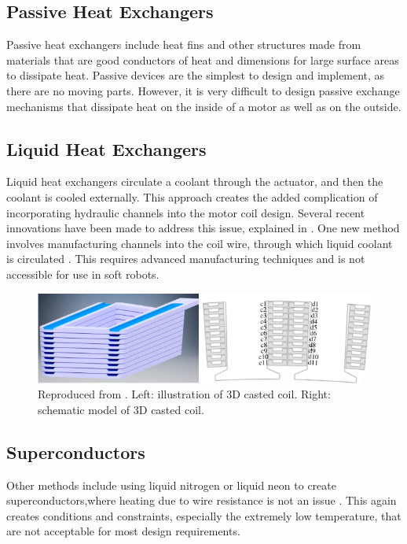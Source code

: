 \documentclass[a4paper,12pt]{article}
\begin{document}
\subsection{Passive Heat Exchangers}
Passive heat exchangers include heat fins and other structures made from materials that are good conductors of heat and dimensions for large surface areas to dissipate heat. Passive devices are the simplest to design and implement, as there are no moving parts. However, it is very difficult to design passive exchange mechanisms that dissipate heat on the inside of a motor as well as on the outside.

\subsection{Liquid Heat Exchangers}
Liquid heat exchangers circulate a coolant through the actuator, and then the coolant is cooled externally. This approach creates the added complication of incorporating hydraulic channels into the motor coil design. Several recent innovations have been made to address this issue, explained in \cite{henkeChallengesOpportunitiesVery2018}. One new method involves manufacturing channels into the coil wire, through which liquid coolant is circulated \cite{wohlersDesignDirectLiquid2018}. This requires advanced manufacturing techniques and is not accessible for use in soft robots.

\begin{figure}[h!]
    \centering
    \includegraphics[width=\textwidth]{liquidcool.png}
    \caption{Reproduced from \cite{wohlersDesignDirectLiquid2018}. Left: illustration of 3D casted coil. Right: schematic model of 3D casted coil.}
    \label{fg:coilmotor}
\end{figure}

\subsection{Superconductors}
Other methods include using liquid nitrogen or liquid neon to create superconductors,where heating due to wire resistance is not an issue \cite{henkeChallengesOpportunitiesVery2018}. This again creates conditions and constraints, especially the extremely low temperature, that are not acceptable for most design requirements.
\end{document}
